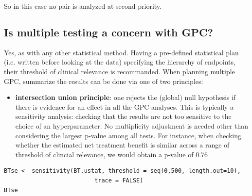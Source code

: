 \documentclass[12pt]{article}
\begin{document}
So in this case no pair is analyzed at second priority.

\clearpage


\subsection{Is multiple testing a concern with GPC?}
\label{sec:org33ebd75}

Yes, as with any other statistical method. Having a pre-defined
statistical plan (i.e. written before looking at the data) specifying
the hierarchy of endpoints, their threshold of clinical relevance is
recommanded. When planning multiple GPC, summarize the results can be
done via one of two principles:
\begin{itemize}
\item \textbf{intersection union principle}: one rejects the (global) null
hypothesis if there is evidence for an effect in all the GPC
analyses. This is typically a sensitivity analysis: checking that
the results are not too sensitive to the choice of an
hyperparameter. No multiplicity adjustment is needed other than
considering the largest p-value among all tests. For instance, when
checking whether the estimated net treatment benefit is similar across a range
of threshold of clincial relevance, we would obtain a p-value of
0.76
\end{itemize}
\lstset{language=r,label= ,caption= ,captionpos=b,numbers=none}
\begin{lstlisting}
BTse <- sensitivity(BT.ustat, threshold = seq(0,500, length.out=10),
                          trace = FALSE)
BTse
\end{lstlisting}
\end{document}
